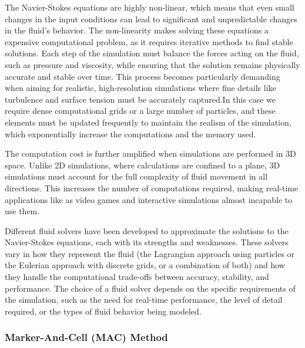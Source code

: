 The Navier-Stokes equations are highly non-linear, which means that even small changes in the input conditions can lead to significant and unpredictable changes in the fluid's behavior. The non-linearity makes solving these equations a expensive computational problem, as it requires iterative methods to find stable solutions. Each step of the simulation must balance the forces acting on the fluid, such as pressure and viscosity, while ensuring that the solution remains physically accurate and stable over time. This process becomes particularly demanding when aiming for realistic, high-resolution simulations where fine details like turbulence and surface tension must be accurately captured.In this case we require dense computational grids or a large number of particles, and these elements must be updated frequently to maintain the realism of the simulation, which exponentially increase the computations and the memory used.

The computation cost is further amplified when simulations are performed in 3D space. Unlike 2D simulations, where calculations are confined to a plane, 3D simulations must account for the full complexity of fluid movement in all directions. This increases the number of computations required, making real-time applications like as video games and interactive simulations almost incapable to use them.

Different fluid solvers have been developed to approximate the solutions to the Navier-Stokes equations, each with its strengths and weaknesses. These solvers vary in how they represent the fluid (the Lagrangian approach using particles or the Eulerian approach with discrete grids, or a combination of both) and how they handle the computational trade-offs between accuracy, stability, and performance. The choice of a fluid solver depends on the specific requirements of the simulation, such as the need for real-time performance, the level of detail required, or the types of fluid behavior being modeled.

\subsubsection{Marker-And-Cell (MAC) Method}

